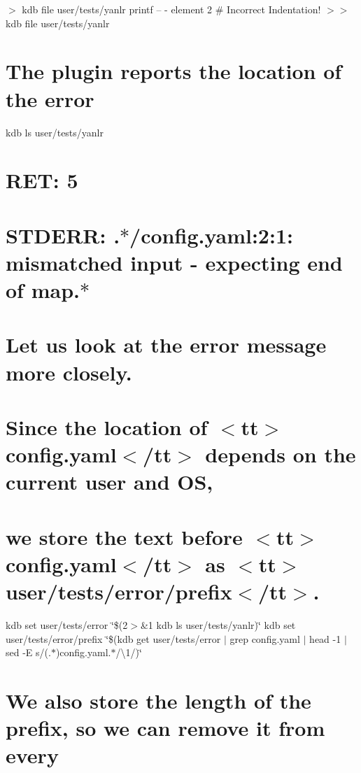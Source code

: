 \textquotesingle{} $>$ {\ttfamily kdb file user/tests/yanlr} printf -- \textquotesingle{}-\/ element 2 \# Incorrect Indentation!\textquotesingle{} $>$$>$ {\ttfamily kdb file user/tests/yanlr}\hypertarget{autotoc_md861_autotoc_md889}{}\section{The plugin reports the location of the error}\label{autotoc_md861_autotoc_md889}
kdb ls user/tests/yanlr \hypertarget{autotoc_md861_autotoc_md890}{}\section{R\+E\+T\+: 5}\label{autotoc_md861_autotoc_md890}
\hypertarget{autotoc_md861_autotoc_md891}{}\section{S\+T\+D\+E\+R\+R\+: .$\ast$/config.\+yaml\+:2\+:1\+: mismatched input \textquotesingle{}-\/ \textquotesingle{} expecting end of map.$\ast$}\label{autotoc_md861_autotoc_md891}
\hypertarget{autotoc_md861_autotoc_md892}{}\section{Let us look at the error message more closely.}\label{autotoc_md861_autotoc_md892}
\hypertarget{autotoc_md861_autotoc_md893}{}\section{Since the location of $<$tt$>$config.\+yaml$<$/tt$>$ depends on the current user and O\+S,}\label{autotoc_md861_autotoc_md893}
\hypertarget{autotoc_md861_autotoc_md894}{}\section{we store the text before $<$tt$>$config.\+yaml$<$/tt$>$ as $<$tt$>$user/tests/error/prefix$<$/tt$>$.}\label{autotoc_md861_autotoc_md894}
kdb set user/tests/error \char`\"{}\$(2$>$\&1 kdb ls user/tests/yanlr)\char`\"{} kdb set user/tests/error/prefix \char`\"{}\$(kdb get user/tests/error $\vert$ grep \textquotesingle{}config.\+yaml\textquotesingle{} $\vert$ head -\/1 $\vert$ sed -\/\+E \textquotesingle{}s/(.$\ast$)config.\+yaml.$\ast$/\textbackslash{}1/\textquotesingle{})\char`\"{} \hypertarget{autotoc_md861_autotoc_md895}{}\section{We also store the length of the prefix, so we can remove it from every}\label{autotoc_md861_autotoc_md895}
$$
